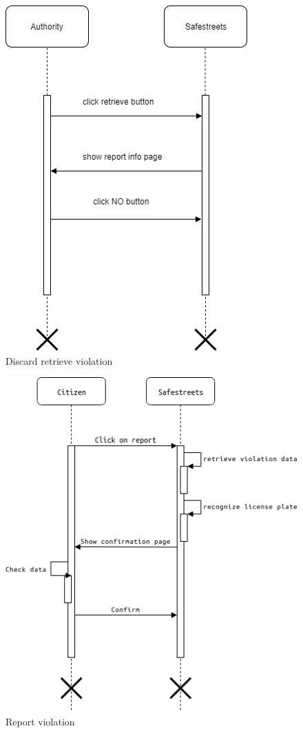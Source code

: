 \documentclass{article}
\begin{document}
\begin{figure}[H]
    \centering
    \includegraphics[scale=0.5]{img/sequence_diagrams/discard_retrieve_violation.png}
    \caption{Discard retrieve violation}
\end{figure}


\begin{figure}[H]
    \centering
    \includegraphics[scale=0.5]{img/sequence_diagrams/report_violation.png}
    \caption{Report violation}
\end{figure}
\end{document}
